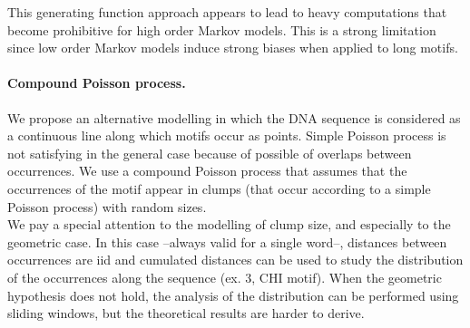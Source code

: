 \documentclass[11pt,a4paper,french]{article}
\begin{document}
This generating function approach appears to lead to heavy
computations that become prohibitive for high order Markov models.
This is a strong limitation since low order Markov models induce
strong biases when applied to long motifs.

\paragraph{Compound Poisson process.}  
We propose an alternative modelling in which the DNA sequence is
considered as a continuous line along which motifs occur as points.
Simple Poisson process is not satisfying in the general case because
of possible of overlaps between occurrences. We use a compound Poisson
process that assumes that the occurrences of the motif appear in
clumps (that occur according to a simple Poisson process) with random
sizes. \\
We pay a special attention to the modelling of clump size, and
especially to the geometric case. In this case --always valid for a
single word--, distances between occurrences are iid and cumulated
distances can be used to study the distribution of the occurrences
along the sequence (ex. 3, CHI motif). When the geometric hypothesis
does not hold, the analysis of the distribution can be performed using
sliding windows, but the theoretical results are harder to derive.


%
%

\end{document}
